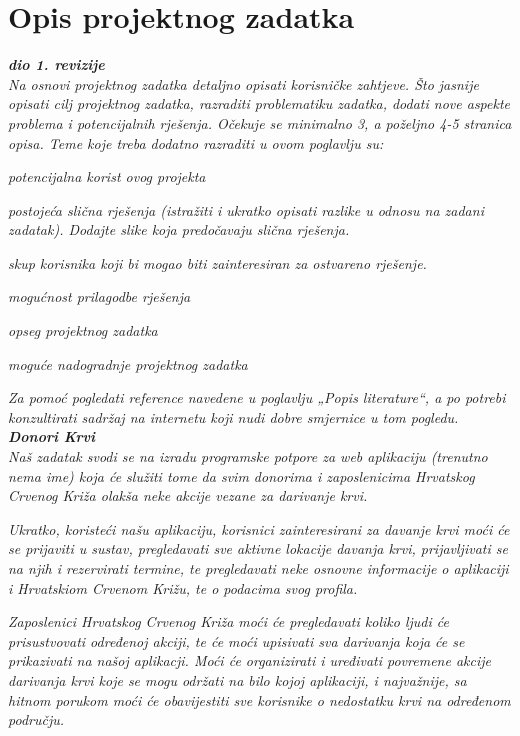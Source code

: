 \chapter{Opis projektnog zadatka}
		
		\textbf{\textit{dio 1. revizije}}\\
		
		\textit{Na osnovi projektnog zadatka detaljno opisati korisničke zahtjeve. Što jasnije opisati cilj projektnog zadatka, razraditi problematiku zadatka, dodati nove aspekte problema i potencijalnih rješenja. Očekuje se minimalno 3, a poželjno 4-5 stranica opisa.	Teme koje treba dodatno razraditi u ovom poglavlju su:}
		\begin{packed_item}
			\item \textit{potencijalna korist ovog projekta}
			\item \textit{postojeća slična rješenja (istražiti i ukratko opisati razlike u odnosu na zadani zadatak). Dodajte slike koja predočavaju slična rješenja.}
			\item \textit{skup korisnika koji bi mogao biti zainteresiran za ostvareno rješenje.}
			\item \textit{mogućnost prilagodbe rješenja }
			\item \textit{opseg projektnog zadatka}
			\item \textit{moguće nadogradnje projektnog zadatka}
		\end{packed_item}
		
		\textit{Za pomoć pogledati reference navedene u poglavlju „Popis literature“, a po potrebi konzultirati sadržaj na internetu koji nudi dobre smjernice u tom pogledu.}\\

		\textbf{\textit{Donori Krvi}}\\

		\textit{Naš zadatak svodi se na izradu programske potpore za web aplikaciju (trenutno nema ime) koja će služiti tome da svim donorima i zaposlenicima Hrvatskog Crvenog Križa olakša neke akcije vezane za darivanje krvi.}

		\textit{Ukratko, koristeći našu aplikaciju, korisnici zainteresirani za davanje krvi moći će se prijaviti u sustav, pregledavati sve aktivne lokacije davanja krvi, prijavljivati se na njih i rezervirati termine, te pregledavati neke osnovne informacije o aplikaciji i Hrvatskiom Crvenom Križu, te o podacima svog profila.}

		\textit{Zaposlenici Hrvatskog Crvenog Križa moći će pregledavati koliko ljudi će prisustvovati određenoj akciji, te će moći upisivati sva darivanja koja će se prikazivati na našoj aplikacji. Moći će organizirati i uređivati povremene akcije darivanja krvi koje se mogu održati na bilo kojoj aplikaciji, i najvažnije, sa hitnom porukom moći će obavijestiti sve korisnike o nedostatku krvi na određenom području.}

